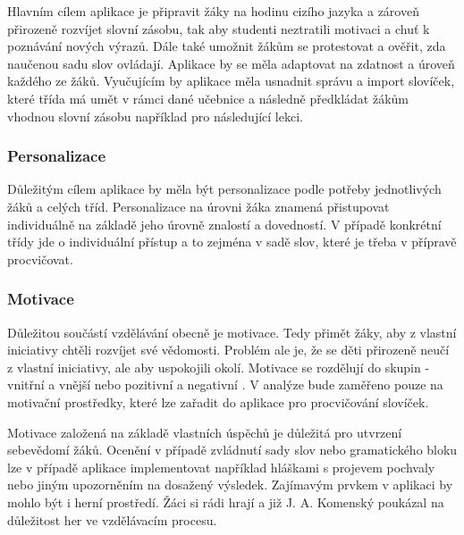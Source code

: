\documentclass[a4paper,11pt,titlepage,fleqn]{article}
\begin{document}
        Hlavním cílem aplikace je připravit žáky na hodinu cizího jazyka a zároveň přirozeně rozvíjet slovní zásobu, tak aby studenti neztratili motivaci a chuť k poznávání nových výrazů. Dále také umožnit žákům se protestovat a ověřit, zda naučenou sadu slov ovládají. Aplikace by se měla adaptovat na zdatnost a úroveň každého ze žáků. Vyučujícím by aplikace měla usnadnit správu a import slovíček, které třída má umět v rámci dané učebnice a následně předkládat žákům vhodnou slovní zásobu například pro následující lekci.

        \subsubsection{Personalizace}
            Důležitým cílem aplikace by měla být personalizace podle potřeby jednotlivých žáků a celých tříd. Personalizace na úrovni žáka znamená přistupovat individuálně na základě jeho úrovně znalostí a dovedností. V případě konkrétní třídy jde o individuální přístup a to zejména v sadě slov, které je třeba v přípravě procvičovat. 

        \subsubsection{Motivace}
            Důležitou součástí vzdělávání obecně je motivace. Tedy přimět žáky, aby z vlastní iniciativy chtěli rozvíjet své vědomosti. Problém ale je, že se děti přirozeně neučí z vlastní iniciativy, ale aby uspokojili okolí. Motivace se rozdělují do skupin - vnitřní a vnější nebo pozitivní a negativní \cite{bib:motivace}. V analýze bude zaměřeno pouze na motivační prostředky, které lze zařadit do aplikace pro procvičování slovíček.

            Motivace založená na základě vlastních úspěchů je důležitá pro utvrzení sebevědomí žáků. Ocenění v případě zvládnutí sady slov nebo gramatického bloku lze v případě aplikace implementovat například hláškami s projevem pochvaly nebo jiným upozorněním na dosažený výsledek. Zajímavým prvkem v aplikaci by mohlo být i herní prostředí. Žáci si rádi hrají a již J. A. Komenský poukázal na důležitost her ve vzdělávacím procesu.

\end{document}

